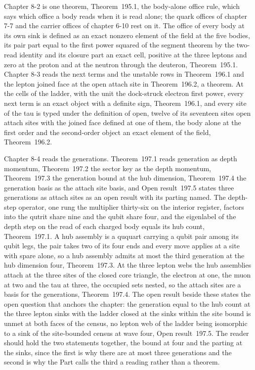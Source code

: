 Chapter 8-2 is one theorem, Theorem~195.1, the body-alone office rule, which says which office a body reads when it is read alone; the quark offices of chapter 7-7 and the carrier offices of chapter 6-10 rest on it. The office of every body at its own sink is defined as an exact nonzero element of the field at the five bodies, its pair part equal to the first power squared of the segment theorem by the two-read identity and its closure part an exact cell, positive at the three leptons and zero at the proton and at the neutron through the deuteron, Theorem~195.1. Chapter 8-3 reads the next terms and the unstable rows in Theorem~196.1 and the lepton joined face at the open attach site in Theorem~196.2, a theorem. At the cells of the ladder, with the unit the dock-struck electron first power, every next term is an exact object with a definite sign, Theorem~196.1, and every site of the tau is typed under the definition of open, twelve of its seventeen sites open attach sites with the joined face defined at one of them, the body alone at the first order and the second-order object an exact element of the field, Theorem~196.2.

Chapter 8-4 reads the generations. Theorem~197.1 reads generation as depth momentum, Theorem~197.2 the sector key as the depth momentum, Theorem~197.3 the generation bound at the hub dimension, Theorem~197.4 the generation basis as the attach site basis, and Open result~197.5 states three generations as attach sites as an open result with its parting named. The depth-step operator, one rung the multiplier thirty-six on the interior register, factors into the qutrit share nine and the qubit share four, and the eigenlabel of the depth step on the read of each charged body equals its hub count, Theorem~197.1. A hub assembly is a ququart carrying a qubit pair among its qubit legs, the pair takes two of its four ends and every move applies at a site with spare alone, so a hub assembly admits at most the third generation at the hub dimension four, Theorem~197.3. At the three lepton webs the hub assemblies attach at the three sites of the closed core triangle, the electron at one, the muon at two and the tau at three, the occupied sets nested, so the attach sites are a basis for the generations, Theorem~197.4. The open result beside these states the open question that anchors the chapter: the generation equal to the hub count at the three lepton sinks with the ladder closed at the sinks within the site bound is unmet at both faces of the census, no lepton web of the ladder being isomorphic to a sink of the site-bounded census at wave four, Open result~197.5. The reader should hold the two statements together, the bound at four and the parting at the sinks, since the first is why there are at most three generations and the second is why the Part calls the third a reading rather than a theorem.

